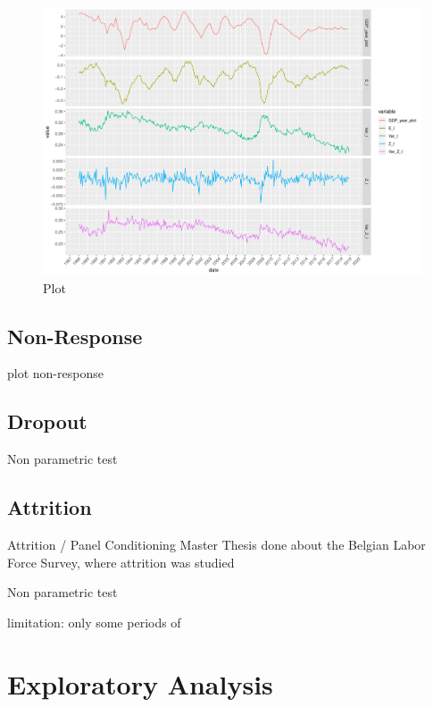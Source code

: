 \documentclass[12pt,a4paper,oneside]{book}
\begin{document}
\begin{figure}[H]
    \centering
    \captionsetup{justification=centering}
    \includegraphics[scale=0.5]{Graphs/plot_var.pdf}
    \caption{Plot }
    \label{A_corplot}
\end{figure}


\section{Non-Response}

plot non-response



\section{Dropout}

Non parametric test \cite{das_nonparametric_2011}

\section{Attrition}
Attrition / Panel Conditioning 
Master Thesis done about the Belgian Labor Force Survey, where  attrition was studied \cite{priyana_hardjawidjaksana_investigating_2019}

Non parametric test \cite{das_nonparametric_2011}


limitation: only some periods of 


\chapter{Exploratory Analysis}
\end{document}
